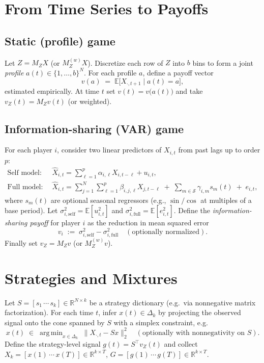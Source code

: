 \documentclass[11pt]{article}
\newcommand{\R}{\mathbb{R}}
\newcommand{\E}{\mathbb{E}}
\DeclareMathOperator*{\argmin}{arg\,min}
\begin{document}
\section{From Time Series to Payoffs}
\subsection{Static (profile) game}
Let $Z=M_Z X$ (or $M_Z^{(w)}X$). Discretize each row of $Z$ into $b$ bins to form a joint \emph{profile} $a(t)\in\{1,\dots,b\}^N$. For each profile $a$, define a payoff vector
\begin{equation}
v(a) \;=\; \E\!\big[X_{\cdot,t+1}\mid a(t)=a\big],
\end{equation}
estimated empirically. At time $t$ set $v(t)=v\!\big(a(t)\big)$ and take $v_Z(t)=M_Z v(t)$ (or weighted).

\subsection{Information-sharing (VAR) game}
For each player $i$, consider two linear predictors of $X_{i,t}$ from past lags up to order $p$:
\begin{align}
\text{Self model: }\quad & \hat X_{i,t} = \sum_{\ell=1}^p \alpha_{i,\ell} X_{i,t-\ell} + u_{i,t},\\
\text{Full model: }\quad & \hat X_{i,t} = \sum_{j=1}^N \sum_{\ell=1}^p \beta_{i,j,\ell} X_{j,t-\ell} \;+\; \sum_{m\in\mathcal{S}} \gamma_{i,m} s_m(t) \;+\; e_{i,t},
\end{align}
where $s_m(t)$ are optional seasonal regressors (e.g., $\sin/\cos$ at multiples of a base period). Let $\sigma^2_{i,\mathrm{self}}=\E[u_{i,t}^2]$ and $\sigma^2_{i,\mathrm{full}}=\E[e_{i,t}^2]$. Define the \emph{information-sharing payoff} for player $i$ as the reduction in mean squared error
\begin{equation}
v_i \;:=\; \sigma^2_{i,\mathrm{self}} - \sigma^2_{i,\mathrm{full}} \quad (\text{optionally normalized}).
\end{equation}
Finally set $v_Z = M_Z v$ (or $M_Z^{(w)}v$).

\section{Strategies and Mixtures}
Let $S=[s_1\,\cdots\,s_k]\in\R^{N\times k}$ be a strategy dictionary (e.g.\ via nonnegative matrix factorization). For each time $t$, infer $x(t)\in\Delta_k$ by projecting the observed signal onto the cone spanned by $S$ with a simplex constraint, e.g.
\begin{equation}
x(t)\;\in\;\argmin_{x\in\Delta_k}\;\|X_{\cdot,t}-Sx\|_2^2\quad (\text{optionally with nonnegativity on }S).
\end{equation}
Define the strategy-level signal $g(t)=S^\top v_Z(t)$ and collect $X_k=[x(1)\,\cdots\,x(T)]\in\R^{k\times T}$, $G=[g(1)\,\cdots\,g(T)]\in\R^{k\times T}$.
\end{document}
